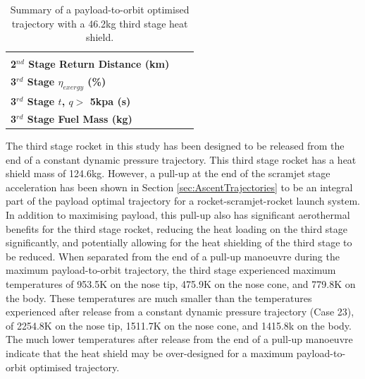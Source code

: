 \begin{table}[!ht]
\begin{tabular}{l c c}
		& \returnFuelStandard
		\\
		\textbf{2$^{nd}$ Stage Return Distance (km)}
		& \returnDistTPSreduced
		& \returnDistStandard
		\\
		\hline 
		\textbf{3$^{rd}$ Stage $\eta_{exergy}$ (\%)}
		& \textbf{\thirddExergyEffTPSreduced}
		& \textbf{\thirddExergyEffStandard}
		\\
		\textbf{3$^{rd}$ Stage $t$, $q >$ 5kpa (s)}
		& \thirdqOverFiveTPSreduced
		& \thirdqOverFiveStandard
		\\
		\textbf{3$^{rd}$ Stage Fuel Mass (kg)}
		& \thirdmFuelTPSreduced
		& \thirdmFuelStandard
		\\
		\hline 
	\end{tabular} 
	
	\caption{Summary of a payload-to-orbit optimised trajectory with a 46.2kg third stage heat shield.}
	\label{tab:heatshieldreduced}
	
\end{table}

The third stage rocket in this study has been designed to be released from the end of a constant dynamic pressure trajectory\cite{Preller2018a}. This third stage rocket has a heat shield mass of 124.6kg. However, a pull-up at the end of the scramjet stage acceleration has been shown in Section \ref{sec:AscentTrajectories} to be an integral part of the payload optimal trajectory for a rocket-scramjet-rocket launch system. In addition to maximising payload, this pull-up also has significant aerothermal benefits for the third stage rocket, reducing the heat loading on the third stage significantly, and potentially allowing for the heat shielding of the third stage to be reduced. When separated from the end of a pull-up manoeuvre during the maximum payload-to-orbit trajectory, the third stage experienced maximum temperatures of 953.5K on the nose tip, 475.9K on the nose cone, and 779.8K on the body. These temperatures are much smaller than the temperatures experienced after release from a constant dynamic pressure trajectory (Case 23), of 2254.8K on the nose tip, 1511.7K on the nose cone, and 1415.8k on the body. The much lower temperatures after release from the end of a pull-up manoeuvre indicate that the heat shield may be over-designed for a maximum payload-to-orbit optimised trajectory.

